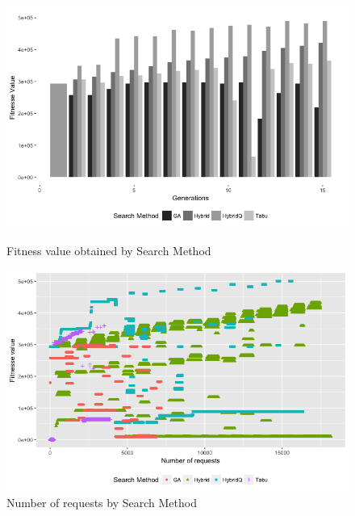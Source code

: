 \documentclass{bmcart}
\begin{document}
\begin{backmatter}
\begin{figure}[h]
\begin{minipage}{.5\textwidth}
\centering
\includegraphics{./images/experiment1-1.png}
\caption{Fitness value obtained by Search Method }
\label{fig:fitnessbygeneration1}
\end{minipage}
\begin{minipage}{.5\textwidth}
\centering
\includegraphics{./images/experiment1-3.png}
\caption{Number of requests by Search Method}
\label{fig:numberofrequestsbysearchmethod}
\end{minipage}
\end{figure}



\end{backmatter}
\end{document}
